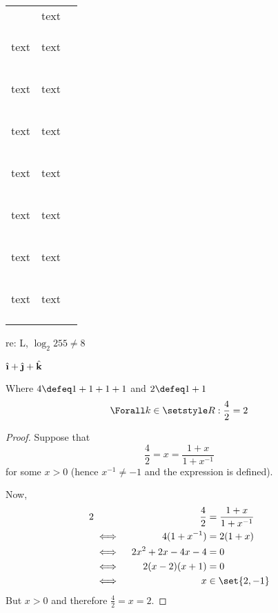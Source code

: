 \begin{longtable}{*3c}
\begin{tabular}{*2c}
\begin{footnotesize}text\end{footnotesize} &
{\footnotesize text} \\ %
\begin{small}text\end{small} &
{\small text} \\
\begin{normalsize}text\end{normalsize} &
{\normalsize text} \\ %
\begin{large}text\end{large} &
{\large text} \\
\begin{Large}text\end{Large} &
{\Large text} \\
\begin{LARGE}text\end{LARGE} &
{\LARGE text} \\
\begin{huge}text\end{huge} &
{\huge text} \\
\begin{Huge}text\end{Huge} &
{\Huge text} \\
\end{tabular} \\
\end{longtable}

re: L, \(\log_2 255 \ne 8\)

\(\uveci + \uvecj + \uveck\)

\begin{lemma}
Where \(4 \defeq 1 + 1 + 1 + 1\) and \(2 \defeq 1 + 1\)
\begin{equation}
\Forall k \in \Reals: \frac 42 = 2
\end{equation}
\end{lemma}

\begin{proof}
Suppose that
\begin{equation*}
\frac 42 = x = \frac{1 + x}{1 + x^{-1}}
\end{equation*}
for some \(x > 0\) (hence \(x^{-1} \neq -1\) and the expression is defined).

Now,
\begin{alignat*} 2
 &&\frac 42 &= \frac{1 + x}{1 + x^{-1}} \\
 &\iff{}& 4(1 + x^{-1}) &= 2(1 + x) \\
 &\iff{}& 2x^2 + 2x - 4x - 4 &= 0 \\
 &\iff{}& 2(x - 2)(x + 1) &= 0 \\
 &\iff{}& x &\in \set{2, -1} 
\end{alignat*}
But \(x > 0\) and therefore \(\frac 42 = x = 2\).
\end{proof}

